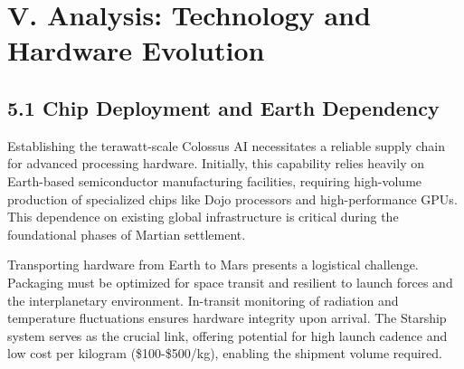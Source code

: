 \documentclass[fontsize=10pt, oneside, DIV=calc]{scrartcl}
\begin{document}
\begin{comment}
ColossusHeat -down-> HeatReject : ``Generates\nHeat''

MarsEnv -down-> HeatReject : ``Affects''
MarsEnv -down-> Challenges : ``Presents''

HeatReject -down-> Radiative : ``Includes''
HeatReject -down-> FCHX : ``Includes''

HeatReject -right-> Metrics : ``Measured by''
HeatReject -left-> Challenges : ``Faces''

NewConcepts -up-> HeatReject : ``Improves''
NewConcepts -left-> Challenges : ``Addresses''

Metrics -up-> Challenges : ``Highlight Issues''

@enduml
\end{comment}




            
\section*{V. Analysis: Technology and Hardware Evolution}



\subsection*{5.1 Chip Deployment and Earth Dependency}



\medskip

\noindent
Establishing the terawatt-scale Colossus AI necessitates a reliable supply chain for advanced processing hardware. Initially, this capability relies heavily on Earth-based semiconductor manufacturing facilities, requiring high-volume production of specialized chips like Dojo processors and high-performance GPUs. This dependence on existing global infrastructure is critical during the foundational phases of Martian settlement.

\medskip

\noindent
Transporting hardware from Earth to Mars presents a logistical challenge. Packaging must be optimized for space transit and resilient to launch forces and the interplanetary environment. In-transit monitoring of radiation and temperature fluctuations ensures hardware integrity upon arrival. The Starship system serves as the crucial link, offering potential for high launch cadence and low cost per kilogram (\$100-\$500/kg), enabling the shipment volume required.
\end{document}
